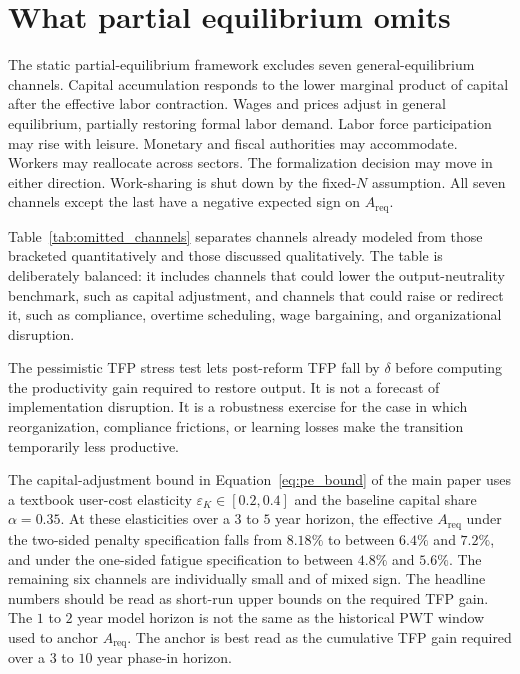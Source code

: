 \documentclass[12pt,a4paper]{article}
\begin{document}
\clearpage
\section{What partial equilibrium omits}\label{app:pe_omits}

The static partial-equilibrium framework excludes seven general-equilibrium channels. Capital accumulation responds to the lower marginal product of capital after the effective labor contraction. Wages and prices adjust in general equilibrium, partially restoring formal labor demand. Labor force participation may rise with leisure. Monetary and fiscal authorities may accommodate. Workers may reallocate across sectors. The formalization decision may move in either direction. Work-sharing is shut down by the fixed-$N$ assumption. All seven channels except the last have a negative expected sign on $A_{\text{req}}$.

Table~\ref{tab:omitted_channels} separates channels already modeled from those bracketed quantitatively and those discussed qualitatively. The table is deliberately balanced: it includes channels that could lower the output-neutrality benchmark, such as capital adjustment, and channels that could raise or redirect it, such as compliance, overtime scheduling, wage bargaining, and organizational disruption.



The pessimistic TFP stress test lets post-reform TFP fall by $\delta$ before computing the productivity gain required to restore output. It is not a forecast of implementation disruption. It is a robustness exercise for the case in which reorganization, compliance frictions, or learning losses make the transition temporarily less productive.



The capital-adjustment bound in Equation~\eqref{eq:pe_bound} of the main paper uses a textbook user-cost elasticity $\varepsilon_K\in[0.2,0.4]$ \citep{Caballero1999} and the baseline capital share $\alpha=0.35$. At these elasticities over a $3$ to $5$ year horizon, the effective $A_{\text{req}}$ under the two-sided penalty specification falls from $8.18\%$ to between $6.4\%$ and $7.2\%$, and under the one-sided fatigue specification to between $4.8\%$ and $5.6\%$. The remaining six channels are individually small and of mixed sign. The headline numbers should be read as short-run upper bounds on the required TFP gain. The $1$ to $2$ year model horizon is not the same as the historical PWT window used to anchor $A_{\text{req}}$. The anchor is best read as the cumulative TFP gain required over a $3$ to $10$ year phase-in horizon.
\end{document}
